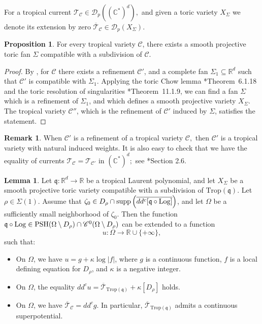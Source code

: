 \documentclass[11pt]{amsart}
\def\Log{{\rm Log}}
\theoremstyle{definition}
\newtheorem{lemma}[theorem]{Lemma}
\newtheorem{proposition}[theorem]{Proposition}
\newtheorem{remark}[theorem]{Remark}
\newcommand{\R}{\mathbb{R}}
\newcommand{\C}{\mathbb{C}}
\newcommand{\sD}{\mathscr{D}}
\newcommand{\cC}{\mathcal{C}}
\newcommand{\sT}{\mathscr{T}}
\newcommand{\fq}{\mathfrak{q}}
\newcommand{\Trop}{\mathrm{Trop}}
\begin{document}
For a tropical current $\sT_{\cC} \in \sD_{p}((\C^*)^d),$ and given a toric variety $X_\Sigma$ we denote its extension by zero $\overline{\sT}_{\cC} \in \sD_{p}(X_{\Sigma}).$
\begin{proposition}
For every tropical variety \(\cC\), there exists a smooth projective toric fan \(\Sigma\) compatible with a subdivision of \(\cC\).
\end{proposition}

\begin{proof}
By \cite{Gil-Sombra}, for \(\cC\) there exists a refinement \(\cC'\), and a complete fan \(\Sigma_1 \subseteq \R^d\) such that \(\cC'\) is compatible with \(\Sigma_1\). Applying the toric Chow lemma \cite{Cox-Little-Schenck}*{Theorem~6.1.18} and the toric resolution of singularities \cite{Cox-Little-Schenck}*{Theorem~11.1.9}, we can find a fan \(\Sigma\) which is a refinement of \(\Sigma_1\), and which defines a smooth projective variety \(X_{\Sigma}\). The tropical variety \(\cC''\), which is the refinement of \(\cC'\) induced by \(\Sigma\), satisfies the statement.
\end{proof}

\begin{remark}
    When $\cC'$ is a refinement of a tropical variety $\cC,$ then $\cC'$ is a tropical variety with natural induced weights. It is also easy to check that we have the equality of currents $\sT_{\cC} = \sT_{\cC'}$ in $(\C^*)^d;$ see \cite{BH}*{Section 2.6}. 

\end{remark}

\begin{lemma} \label{lem:ext-hyper-toric}
Let \( \fq: \mathbb{R}^d \to \mathbb{R} \) be a tropical Laurent polynomial, and let \( X_{\Sigma} \) be a smooth projective toric variety compatible with a subdivision of \( \Trop(\fq) \). Let \( \rho \in \Sigma(1) \). Assume that \( \zeta_0 \in D_{\rho} \cap \operatorname{supp} \left( \overline{dd^c[\fq \circ \Log]} \right) \), and let \( \Omega \) be a sufficiently small neighborhood of \( \zeta_0 \). Then the function \( \fq \circ \Log \in \mathrm{PSH}(\Omega \setminus D_{\rho}) \cap \mathscr{C}^0(\Omega \setminus D_{\rho}) \) can be extended to a function 
\[
u : \Omega \to \mathbb{R} \cup \{ +\infty \},
\]
such that:
\begin{itemize}
    \item[(a)] On \( \Omega \), we have \( u = g + \kappa \log |f| \), where \( g \) is a continuous function, \( f \) is a local defining equation for \( D_{\rho} \), and \( \kappa \) is a negative integer.  
    \item[(b)] On \( \Omega \), the equality \( dd^c u = \overline{\mathscr{T}}_{\Trop(\fq)} + \kappa [D_{\rho}] \) holds.
    \item[(c)] On \( \Omega \), we have \( \overline{\mathscr{T}}_{\mathcal{C}} = dd^c g \). In particular, \( \overline{\mathscr{T}}_{\Trop(\fq)} \) admits a continuous superpotential.
\end{itemize}
\end{lemma}
\end{document}
